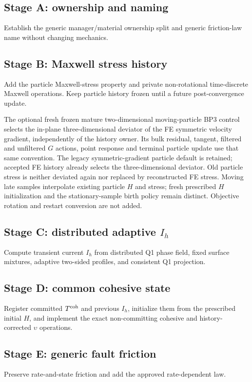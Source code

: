 \documentclass[11pt]{article}
\begin{document}
\subsection*{Stage A: ownership and naming}
Establish the generic manager/material ownership split and generic friction-law
name without changing mechanics.

\subsection*{Stage B: Maxwell stress history}
Add the particle Maxwell-stress property and private non-rotational
time-discrete Maxwell operations. Keep particle history frozen until a future
post-convergence update.

The optional fresh frozen mature two-dimensional moving-particle BP3 control
selects the in-plane three-dimensional deviator of the FE symmetric velocity
gradient, independently of the history owner. Its bulk residual, tangent,
filtered and unfiltered $G$ actions, point response and terminal particle update
use that same convention. The legacy symmetric-gradient particle default is
retained; accepted FE history already selects the three-dimensional deviator.
Old particle stress is neither deviated again nor replaced by reconstructed FE
stress. Moving late samples interpolate existing particle $H$ and stress; fresh
prescribed $H$ initialization and the stationary-sample birth policy remain
distinct. Objective rotation and restart conversion are not added.

\subsection*{Stage C: distributed adaptive \(I_h\)}
Compute transient current \(I_h\) from distributed Q1 phase field, fixed
surface mixtures, adaptive two-sided profiles, and consistent Q1 projection.

\subsection*{Stage D: common cohesive state}
Register committed \(T^{\rm coh}\) and previous \(I_h\), initialize them from
the prescribed initial \(H\), and implement the exact non-committing cohesive
and history-corrected \(\upsilon\) operations.

\subsection*{Stage E: generic fault friction}
Preserve rate-and-state friction and add the approved rate-dependent law.
\end{document}
